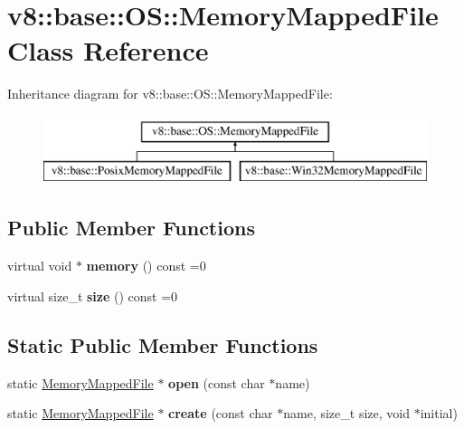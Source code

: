 \hypertarget{classv8_1_1base_1_1_o_s_1_1_memory_mapped_file}{}\section{v8\+:\+:base\+:\+:OS\+:\+:Memory\+Mapped\+File Class Reference}
\label{classv8_1_1base_1_1_o_s_1_1_memory_mapped_file}
Inheritance diagram for v8\+:\+:base\+:\+:OS\+:\+:Memory\+Mapped\+File\+:\begin{figure}[H]
\begin{center}
\leavevmode
\includegraphics[height=2.000000cm]{classv8_1_1base_1_1_o_s_1_1_memory_mapped_file}
\end{center}
\end{figure}
\subsection*{Public Member Functions}
\begin{DoxyCompactItemize}
\item 
virtual void $\ast$ {\bfseries memory} () const  =0\hypertarget{classv8_1_1base_1_1_o_s_1_1_memory_mapped_file_a5a6cdf98c7d7c4028512b2f489196241}{}\label{classv8_1_1base_1_1_o_s_1_1_memory_mapped_file_a5a6cdf98c7d7c4028512b2f489196241}

\item 
virtual size\+\_\+t {\bfseries size} () const  =0\hypertarget{classv8_1_1base_1_1_o_s_1_1_memory_mapped_file_ada3d783888399f7e830bde50a5b519cf}{}\label{classv8_1_1base_1_1_o_s_1_1_memory_mapped_file_ada3d783888399f7e830bde50a5b519cf}

\end{DoxyCompactItemize}
\subsection*{Static Public Member Functions}
\begin{DoxyCompactItemize}
\item 
static \hyperlink{classv8_1_1base_1_1_o_s_1_1_memory_mapped_file}{Memory\+Mapped\+File} $\ast$ {\bfseries open} (const char $\ast$name)\hypertarget{classv8_1_1base_1_1_o_s_1_1_memory_mapped_file_a90ed338ee3a3220111d242d4fa22e95f}{}\label{classv8_1_1base_1_1_o_s_1_1_memory_mapped_file_a90ed338ee3a3220111d242d4fa22e95f}

\item 
static \hyperlink{classv8_1_1base_1_1_o_s_1_1_memory_mapped_file}{Memory\+Mapped\+File} $\ast$ {\bfseries create} (const char $\ast$name, size\+\_\+t size, void $\ast$initial)\hypertarget{classv8_1_1base_1_1_o_s_1_1_memory_mapped_file_a3c10e7c6b424824c2c6cc8dc1dd65f68}{}\label{classv8_1_1base_1_1_o_s_1_1_memory_mapped_file_a3c10e7c6b424824c2c6cc8dc1dd65f68}

\end{DoxyCompactItemize}


